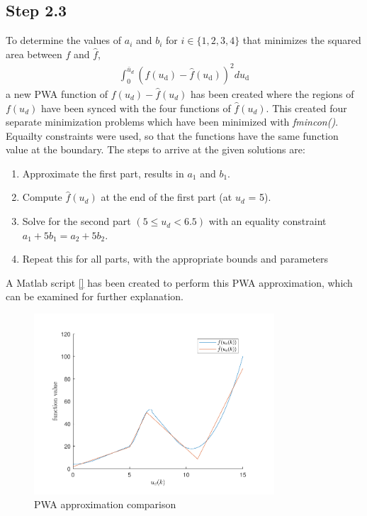 \subsection*{Step 2.3}
\label{sec:2.3}
To determine the values of $a_i$ and $b_i$ for $i \in \{1,2,3,4\}$ that minimizes the squared area between $f$ and $\hat{f}$, 
\begin{align}
    \int_{0}^{\bar{u}_{d}}\left(f\left(u_{\mathrm{d}}\right)-\hat{f}\left(u_{\mathrm{d}}\right)\right)^{2} d u_{\mathrm{d}} \label{eq:2.3cost}
\end{align}
a new PWA function of $f(u_d)-\hat{f}(u_d)$ has been created where the regions of $f(u_d)$ have been synced with the four functions of $\hat{f}(u_d)$. This created four separate minimization problems which have been minimized with \textit{fmincon()}. Equailty constraints were used, so that the functions have the same function value at the boundary. The steps to arrive at the given solutions are:
\begin{enumerate}

    \item Approximate the first part, results in $a_1$ and $b_1$.
    \item Compute $\hat{f}(u_d)$ at the end of the first part (at $u_d$ = 5).
    \item Solve for the second part $(5\leq u_d<6.5)$ with an equality constraint $a_1+5b_1 = a_2+5b_2$.
    \item Repeat this for all parts, with the appropriate bounds and parameters
\end{enumerate}
A Matlab script \ref{} has been created to perform this PWA approximation, which can be examined for further explanation.

\begin{figure}[ht]
    \centering
    \includegraphics[width=0.8\textwidth]{Latex/images/step23.pdf}
    \caption{PWA approximation comparison}
    \label{fig:part23}
\end{figure}
